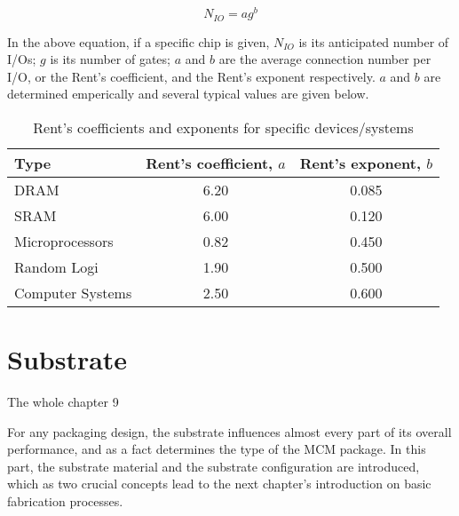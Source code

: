 \begin{spacing}{1.5}
\begin{equation}
    \label{eq.rent}
    N_{IO}=ag^b
\end{equation}

In the above equation, if a specific chip is given, $N_{IO}$ is its anticipated number of I/Os; $g$ is its number of gates; $a$ and $b$ are the average connection number per I/O, or the Rent's coefficient, and the Rent's exponent respectively. \cite{landman1971pin} $a$ and $b$ are determined emperically and several typical values are given below. \cite{tummala2001fundamentals}

\begin{table}[ht]
    \centering 
    \caption{Rent's coefficients and exponents for specific devices/systems} 
    \label{tb.rent} 
    \begin{tabular}[t]{lcc}
        \toprule 
        Type & Rent's coefficient, $a$ & Rent's exponent, $b$ \\ 
        \midrule 
        DRAM & 6.20 & 0.085 \\
        SRAM & 6.00 & 0.120 \\ 
        Microprocessors & 0.82 & 0.450 \\ 
        Random Logi & 1.90 & 0.500 \\
        Computer Systems & 2.50 & 0.600 \\ 
        \bottomrule
    \end{tabular}
\end{table}


\section{Substrate}

The whole chapter 9 \cite{chen2006vlsi}

For any packaging design, the substrate influences almost every part of its overall performance, and as a fact determines the type of the MCM package. In this part, the substrate material and the substrate configuration are introduced, which as two crucial concepts lead to the next chapter's introduction on basic fabrication processes. 




\end{spacing}
